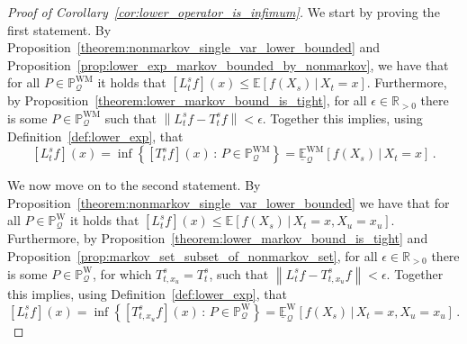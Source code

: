 \documentclass[10pt,a4paper]{paper}
\theoremstyle{definition}
\newcommand{\reals}{\mathbb{R}}
\newcommand{\realspos}{\reals_{>0}}
\newcommand{\processes}{\mathbb{P}}
\newcommand{\wprocesses}{\processes^{\mathrm{W}}}
\newcommand{\wmprocesses}{\processes^{\mathrm{WM}}}
\newcommand{\rateset}{\mathcal{Q}}
\newcommand{\norm}[1]{\left\lVert #1 \right\rVert}
\begin{document}
\begin{proof}[Proof of Corollary~\ref{cor:lower_operator_is_infimum}]
We start by proving the first statement. By Proposition~\ref{theorem:nonmarkov_single_var_lower_bounded} and Proposition~\ref{prop:lower_exp_markov_bounded_by_nonmarkov}, we have that for all $P\in\wmprocesses_\rateset$ it holds that $\left[L_t^sf\right](x) \leq \mathbb{E}[f(X_s)\,\vert\,X_t=x]$. Furthermore, by Proposition~\ref{theorem:lower_markov_bound_is_tight}, for all $\epsilon\in\realspos$ there is some $P\in\wmprocesses_\rateset$ such that $\norm{L_t^sf - T_t^sf} < \epsilon$. Together this implies, using Definition~\ref{def:lower_exp}, that
\begin{equation*}
\left[L_t^sf\right](x) = \inf\left\{\left[T_t^sf\right](x)\,:\,P\in\wmprocesses_\rateset\right\} = \underline{\mathbb{E}}^{\mathrm{WM}}_\rateset\left[f(X_s)\,\vert\,X_t=x\right]\,.
\end{equation*}

We now move on to the second statement. By Proposition~\ref{theorem:nonmarkov_single_var_lower_bounded} we have that for all $P\in\wprocesses_\rateset$ it holds that $\left[L_t^sf\right](x) \leq \mathbb{E}[f(X_s)\,\vert\,X_t=x,X_u=x_u]$.
Furthermore, by Proposition~\ref{theorem:lower_markov_bound_is_tight} and Proposition~\ref{prop:markov_set_subset_of_nonmarkov_set}, for all $\epsilon\in\realspos$ there is some $P\in\wprocesses_\rateset$, for which $T_{t,x_u}^s=T_t^s$, such that
$\norm{L_t^sf - T_{t,x_u}^sf} < \epsilon$.
Together this implies, using Definition~\ref{def:lower_exp}, that
\begin{equation*}
\left[L_t^sf\right](x) = \inf\left\{\left[T_{t,x_u}^sf\right](x)\,:\,P\in\wprocesses_\rateset\right\} = \underline{\mathbb{E}}^\mathrm{W}_\rateset\left[f(X_s)\,\vert\,X_t=x,X_u=x_u\right]\,.
\end{equation*}
\end{proof}
\end{document}
